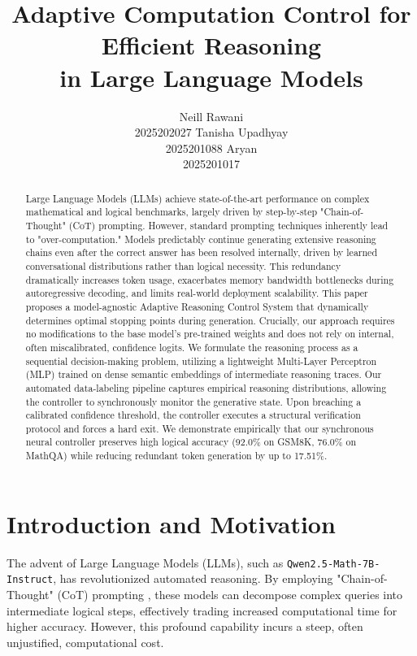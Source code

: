 \documentclass[11pt]{article}
\title{Adaptive Computation Control for Efficient Reasoning \\ in Large Language Models}
\author{
  Neill Rawani \\ 2025202027 \And
  Tanisha Upadhyay \\ 2025201088 \And
  Aryan \\ 2025201017
}
\begin{document}
\maketitle

\begin{abstract}
Large Language Models (LLMs) achieve state-of-the-art performance on complex mathematical and logical benchmarks, largely driven by step-by-step "Chain-of-Thought" (CoT) prompting. However, standard prompting techniques inherently lead to "over-computation." Models predictably continue generating extensive reasoning chains even after the correct answer has been resolved internally, driven by learned conversational distributions rather than logical necessity. This redundancy dramatically increases token usage, exacerbates memory bandwidth bottlenecks during autoregressive decoding, and limits real-world deployment scalability. This paper proposes a model-agnostic Adaptive Reasoning Control System that dynamically determines optimal stopping points during generation. Crucially, our approach requires no modifications to the base model's pre-trained weights and does not rely on internal, often miscalibrated, confidence logits. We formulate the reasoning process as a sequential decision-making problem, utilizing a lightweight Multi-Layer Perceptron (MLP) trained on dense semantic embeddings of intermediate reasoning traces. Our automated data-labeling pipeline captures empirical reasoning distributions, allowing the controller to synchronously monitor the generative state. Upon breaching a calibrated confidence threshold, the controller executes a structural verification protocol and forces a hard exit. We demonstrate empirically that our synchronous neural controller preserves high logical accuracy (92.0\% on GSM8K, 76.0\% on MathQA) while reducing redundant token generation by up to 17.51\%.
\end{abstract}

\section{Introduction and Motivation}
The advent of Large Language Models (LLMs), such as \texttt{Qwen2.5-Math-7B-Instruct}, has revolutionized automated reasoning. By employing "Chain-of-Thought" (CoT) prompting \cite{wei2022chainofthought}, these models can decompose complex queries into intermediate logical steps, effectively trading increased computational time for higher accuracy. However, this profound capability incurs a steep, often unjustified, computational cost. 
\end{document}
